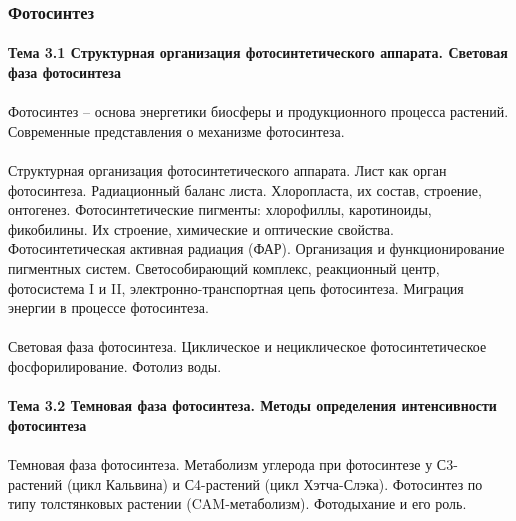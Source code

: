 \subsubsection{Фотосинтез}

\paragraph*{Тема 3.1 Структурная организация фотосинтетического аппарата. Световая фаза фотосинтеза}

\paragraph*{}Фотосинтез – основа энергетики биосферы и продукционного процесса растений. Современные представления о механизме фотосинтеза.

\paragraph*{}Структурная организация фотосинтетического аппарата. Лист как орган фотосинтеза. Радиационный баланс листа. Хлоропласта, их состав, строение, онтогенез. Фотосинтетические пигменты: хлорофиллы, каротиноиды, фикобилины. Их строение, химические и оптические свойства. Фотосинтетическая активная радиация (ФАР). Организация и функционирование пигментных систем. Светособирающий комплекс, реакционный центр, фотосистема I и II, электронно-транспортная цепь фотосинтеза. Миграция энергии в процессе фотосинтеза.

\paragraph*{}Световая фаза фотосинтеза. Циклическое и нециклическое фотосинтетическое фосфорилирование. Фотолиз воды.

\paragraph*{Тема 3.2 Темновая фаза фотосинтеза. Методы определения интенсивности фотосинтеза}

\paragraph*{}Темновая фаза фотосинтеза. Метаболизм углерода при фотосинтезе у С3-растений (цикл Кальвина) и С4-растений (цикл Хэтча-Слэка). Фотосинтез по типу толстянковых растении (CAM-метаболизм). Фотодыхание и его роль.

